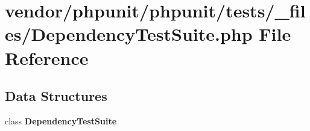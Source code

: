 \section{vendor/phpunit/phpunit/tests/\+\_\+files/\+Dependency\+Test\+Suite.php File Reference}
\label{_dependency_test_suite_8php}
\subsection*{Data Structures}
\begin{DoxyCompactItemize}
\item 
class {\bf Dependency\+Test\+Suite}
\end{DoxyCompactItemize}
